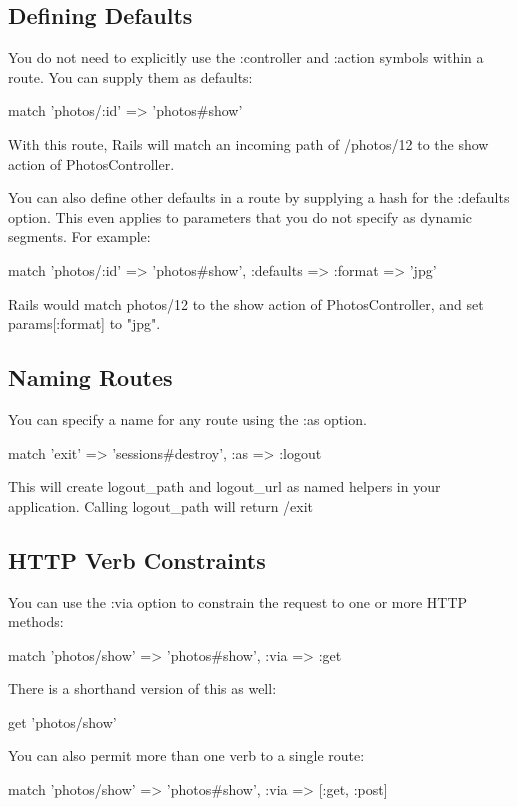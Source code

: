 \documentclass[10pt]{book}
\newenvironment{code}{%
  \scriptsize
    \verbatim
}{%
    \endverbatim
    \newline
}
\begin{document}
\subsection{ Defining Defaults}

You do not need to explicitly use the :controller and :action symbols within a route. You can supply them as defaults:
\begin{code}
match 'photos/:id' => 'photos#show'
\end{code}

With this route, Rails will match an incoming path of /photos/12 to the show action of PhotosController.

You can also define other defaults in a route by supplying a hash for the :defaults option. This even applies to parameters that you do not specify as dynamic segments. For example:
\begin{code}
match 'photos/:id' => 'photos#show', 
      :defaults => { :format => 'jpg' }
\end{code}

Rails would match photos/12 to the show action of PhotosController, and set params[:format] to "jpg".

\subsection{ Naming Routes}

You can specify a name for any route using the :as option.
\begin{code}
match 'exit' => 'sessions#destroy', :as => :logout
\end{code}

This will create logout\_path and logout\_url as named helpers in your application. Calling logout\_path will return /exit

\subsection{ HTTP Verb Constraints}

You can use the :via option to constrain the request to one or more HTTP methods:
\begin{code}
match 'photos/show' => 'photos#show', :via => :get
\end{code}

There is a shorthand version of this as well:
\begin{code}
get 'photos/show'
\end{code}

You can also permit more than one verb to a single route:
\begin{code}
match 'photos/show' => 'photos#show', :via => [:get, :post]
\end{code}
\end{document}
